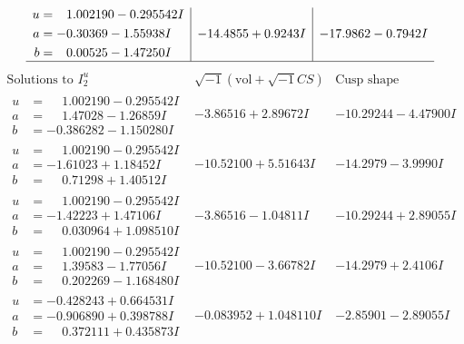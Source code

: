 \documentclass[1p]{elsarticle_modified}
\theoremstyle{definition}
\newcommand{\I}{\sqrt{-1}}
\begin{document}
$$\begin{array}{c|c|c}
\begin{aligned}
u &= \phantom{-}1.002190 - 0.295542 I \\
a &= -0.30369 - 1.55938 I \\
b &= \phantom{-}0.00525 - 1.47250 I\end{aligned}
 & -14.4855 + 0.9243 I & -17.9862 - 0.7942 I\\
 \hline 
 \end{array}$$\newpage$$\begin{array}{c|c|c}  
\text{Solutions to }I^u_{2}& \I (\text{vol} + \sqrt{-1}CS) & \text{Cusp shape}\\
 \hline 
\begin{aligned}
u &= \phantom{-}1.002190 - 0.295542 I \\
a &= \phantom{-}1.47028 - 1.26859 I \\
b &= -0.386282 - 1.150280 I\end{aligned}
 & -3.86516 + 2.89672 I & -10.29244 - 4.47900 I \\ \hline\begin{aligned}
u &= \phantom{-}1.002190 - 0.295542 I \\
a &= -1.61023 + 1.18452 I \\
b &= \phantom{-}0.71298 + 1.40512 I\end{aligned}
 & -10.52100 + 5.51643 I & -14.2979 - 3.9990 I \\ \hline\begin{aligned}
u &= \phantom{-}1.002190 - 0.295542 I \\
a &= -1.42223 + 1.47106 I \\
b &= \phantom{-}0.030964 + 1.098510 I\end{aligned}
 & -3.86516 - 1.04811 I & -10.29244 + 2.89055 I \\ \hline\begin{aligned}
u &= \phantom{-}1.002190 - 0.295542 I \\
a &= \phantom{-}1.39583 - 1.77056 I \\
b &= \phantom{-}0.202269 - 1.168480 I\end{aligned}
 & -10.52100 - 3.66782 I & -14.2979 + 2.4106 I \\ \hline\begin{aligned}
u &= -0.428243 + 0.664531 I \\
a &= -0.906890 + 0.398788 I \\
b &= \phantom{-}0.372111 + 0.435873 I\end{aligned}
 & -0.083952 + 1.048110 I & -2.85901 - 2.89055 I \\ \hline\begin{aligned}

\end{aligned}
\end{array}$$
\end{document}

